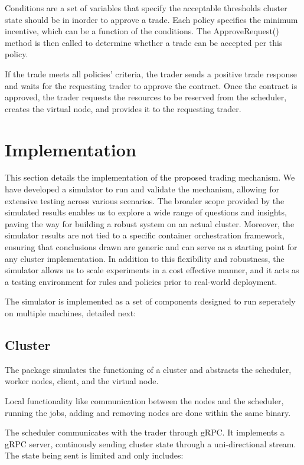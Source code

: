 Conditions are a set of variables that specify the acceptable thresholds
cluster state should be in inorder to approve a trade. Each policy specifies
the minimum incentive, which can be a function of the conditions. The
ApproveRequest() method is then called to determine whether a trade can be
accepted per this policy.

If the trade meets all policies' criteria, the trader sends a positive trade
response and waits for the requesting trader to approve the contract. Once the
contract is approved, the trader requests the resources to be reserved from the
scheduler, creates the virtual node, and provides it to the requesting trader. 

\section{Implementation} 
This section details the implementation of the proposed trading mechanism. We
have developed a simulator to run and validate the mechanism, allowing for
extensive testing across various scenarios. The broader scope provided by the
simulated results enables us to explore a wide range of questions and insights,
paving the way for building a robust system on an actual cluster. Moreover, the
simulator results are not tied to a specific container orchestration framework,
ensuring that conclusions drawn are generic and can serve as a starting point
for any cluster implementation. In addition to this flexibility and robustness,
the simulator allows us to scale experiments in a cost effective manner, and it
acts as a testing environment for rules and policies prior to real-world
deployment.

The simulator is implemented as a set of components designed to run
seperately on multiple machines, detailed next:

\subsection{Cluster}

The package simulates the functioning of a cluster and abstracts the scheduler,
worker nodes, client, and the virtual node. 

Local functionality like communication between the nodes and the scheduler,
running the jobs, adding and removing nodes are done within the same binary.

The scheduler communicates with the trader through gRPC. It implements a
gRPC server, continously sending cluster state through a uni-directional stream.
The state \label{clusterState} being sent is limited and only includes:

